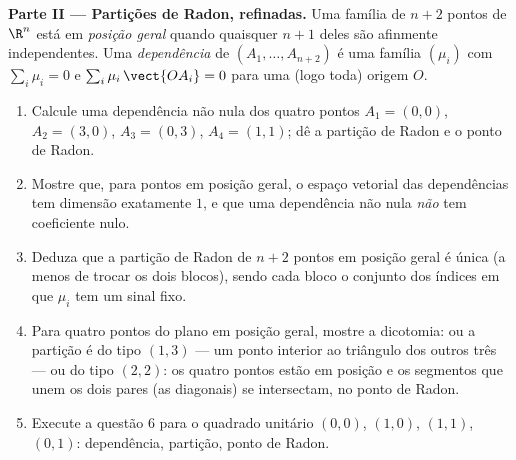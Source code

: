 \begin{problem}
\medskip
\noindent\textbf{Parte II --- Partições de Radon, refinadas.} Uma
família de $n + 2$ pontos de $\R^n$ está em \emph{posição
geral} quando quaisquer $n + 1$ deles são afinmente independentes.
Uma \emph{dependência } de $(A_1, \dots, A_{n+2})$ é uma
família $(\mu_i)$ com $\sum_i \mu_i = 0$ e $\sum_i
\mu_i\,\vect{OA_i} = 0$ para uma (logo toda) origem $O$.
\begin{enumerate}[resume]
  \item Calcule uma dependência  não nula dos quatro
        pontos $A_1 = (0,0)$, $A_2 = (3,0)$, $A_3 = (0,3)$,
        $A_4 = (1,1)$; dê a partição de Radon e o ponto de
        Radon.
  \item Mostre que, para pontos em posição geral, o espaço
        vetorial das dependências  tem dimensão exatamente
        $1$, e que uma dependência não nula \emph{não} tem
        coeficiente nulo.
  \item Deduza que a partição de Radon de $n + 2$ pontos em
        posição geral é única (a menos de trocar os dois
        blocos), sendo cada bloco o conjunto dos índices em que
        $\mu_i$ tem um sinal fixo.
  \item Para quatro pontos do plano em posição geral,
        mostre a dicotomia: ou a partição é do tipo
        $(1, 3)$ --- um ponto interior ao triângulo dos
        outros três --- ou do tipo $(2, 2)$: os quatro pontos
        estão em posição  e os segmentos que unem os
        dois pares (as diagonais) se intersectam, no ponto de
        Radon.
  \item Execute a questão 6 para o quadrado unitário $(0,0)$,
        $(1,0)$, $(1,1)$, $(0,1)$: dependência, partição,
        ponto de Radon.
\end{enumerate}


\end{problem}
